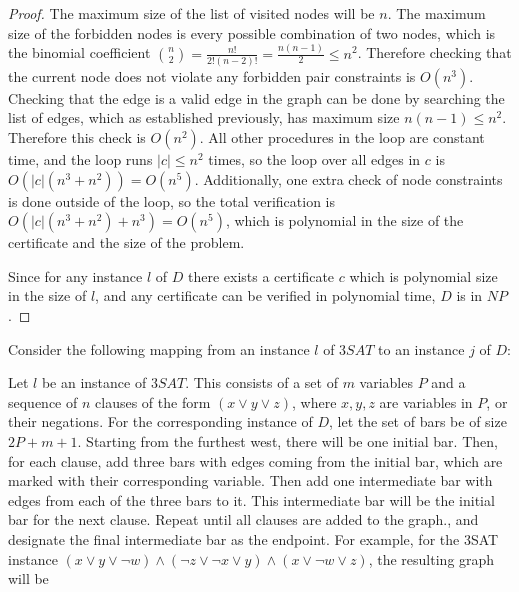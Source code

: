 \documentclass[11pt]{article}
\begin{document}
\begin{proof}
    The maximum size of the list of visited nodes will be $n$. The maximum size of the forbidden nodes is every possible combination of two nodes, which is the binomial coefficient $\binom{n}{2} = \frac{n!}{2!(n-2)!} = \frac{n(n-1)}{2} \leq n^2$. Therefore checking that the current node does not violate any forbidden pair constraints is $O(n^3)$. Checking that the edge is a valid edge in the graph can be done by searching the list of edges, which as established previously, has maximum size $n(n-1) \leq n^2$. Therefore this check is $O(n^2)$. All other procedures in the loop are constant time, and the loop runs $|c| \leq n^2$ times, so the loop over all edges in $c$ is $O(|c|(n^3 + n^2)) = O(n^5)$. Additionally, one extra check of node constraints is done outside of the loop, so the total verification is $O(|c|(n^3 + n^2) + n^3) = O(n^5)$, which is polynomial in the size of the certificate and the size of the problem.

    Since for any instance $l$ of $D$ there exists a certificate $c$ which is polynomial size in the size of $l$, and any certificate can be verified in polynomial time, $D$ is in $NP$.
\end{proof}

Consider the following mapping from an instance $l$ of $3SAT$ to an instance $j$ of $D$:

Let $l$ be an instance of $3SAT$. This consists of a set of $m$ variables $P$ and a sequence of $n$ clauses of the form $(x \lor y \lor z)$, where $x, y, z$ are variables in $P$, or their negations. For the corresponding instance of $D$, let the set of bars be of size $2P + m + 1$. Starting from the furthest west, there will be one initial bar. Then, for each clause, add three bars with edges coming from the initial bar, which are marked with their corresponding variable. Then add one intermediate bar with edges from each of the three bars to it. This intermediate bar will be the initial bar for the next clause. Repeat until all clauses are added to the graph., and designate the final intermediate bar as the endpoint. For example, for the 3SAT instance $(x \lor y \lor \lnot w) \land (\lnot z \lor \lnot x \lor y) \land (x \lor \lnot w \lor z)$, the resulting graph will be 
\begin{figure}[H]
    \centering
\end{figure}
\end{document}
